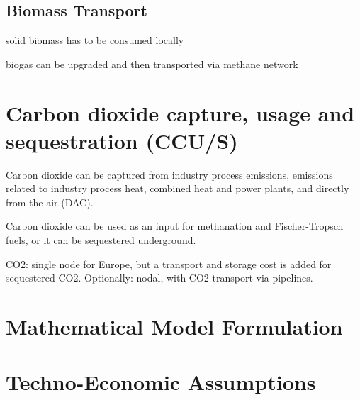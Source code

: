 \subsection{Biomass Transport}

solid biomass has to be consumed locally

biogas can be upgraded and then transported via methane network


\section{Carbon dioxide capture, usage and sequestration (CCU/S)}

Carbon dioxide can be captured from industry process emissions, emissions
related to industry process heat, combined heat and power plants, and directly
from the air (DAC).

Carbon dioxide can be used as an input for methanation and Fischer-Tropsch
fuels, or it can be sequestered underground.

CO2: single node for Europe, but a transport and storage cost is added for sequestered CO2. Optionally: nodal, with CO2 transport via pipelines.

\section{Mathematical Model Formulation}

\section{Techno-Economic Assumptions}

